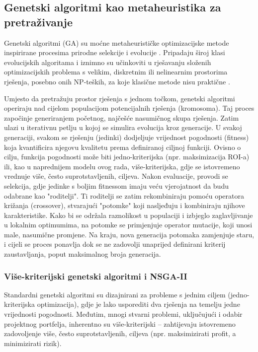 \subsection{Genetski algoritmi kao metaheuristika za pretraživanje}

Genetski algoritmi (GA) su moćne metaheurističke optimizacijske metode inspirirane procesima prirodne selekcije i evolucije \cite{Holland1975, Goldberg1989}. Pripadaju široj klasi evolucijskih algoritama i iznimno su učinkoviti u rješavanju složenih optimizacijskih problema s velikim, diskretnim ili nelinearnim prostorima rješenja, posebno onih NP-teških, za koje klasične metode nisu praktične \cite{Gandomi2013, Mitchell1998}.

Umjesto da pretražuju prostor rješenja s jednom točkom, genetski algoritmi operiraju nad cijelom populacijom potencijalnih rješenja (kromosoma). Taj proces započinje generiranjem početnog, najčešće nasumičnog skupa rješenja. Zatim ulazi u iterativnu petlju u kojoj se simulira evolucija kroz generacije. U svakoj generaciji, svakom se rješenju (jedinki) dodjeljuje vrijednost pogodnosti (fitness) koja kvantificira njegovu kvalitetu prema definiranoj ciljnoj funkciji. Ovisno o cilju, funkcija pogodnosti može biti jedno-kriterijska (npr. maksimizacija ROI-a) ili, kao u naprednijem modelu ovog rada, više-kriterijska, gdje se istovremeno vrednuje više, često suprotstavljenih, ciljeva. Nakon evaluacije, provodi se selekcija, gdje jedinke s boljim fitnessom imaju veću vjerojatnost da budu odabrane kao "roditelji". Ti roditelji se zatim rekombiniraju pomoću operatora križanja (crossover), stvarajući "potomke" koji nasljeđuju i kombiniraju njihove karakteristike. Kako bi se održala raznolikost u populaciji i izbjeglo zaglavljivanje u lokalnim optimumima, na potomke se primjenjuje operator mutacije, koji unosi male, nasumične promjene. Na kraju, nova generacija potomaka zamjenjuje staru, i cijeli se proces ponavlja dok se ne zadovolji unaprijed definirani kriterij zaustavljanja, poput maksimalnog broja generacija.

\subsubsection{Više-kriterijski genetski algoritmi i NSGA-II}

Standardni genetski algoritmi su dizajnirani za probleme s jednim ciljem (jedno-kriterijska optimizacija), gdje je lako usporediti dva rješenja na temelju jedne vrijednosti pogodnosti. Međutim, mnogi stvarni problemi, uključujući i odabir projektnog portfelja, inherentno su više-kriterijski -- zahtijevaju istovremeno zadovoljenje više, često suprotstavljenih, ciljeva (npr. maksimizirati profit, a minimizirati rizik).

